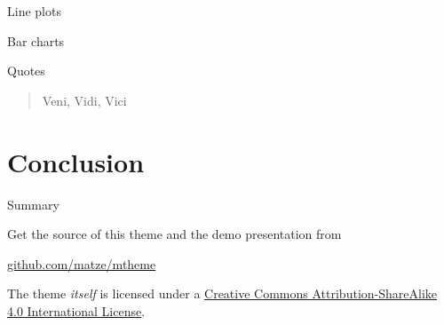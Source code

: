 \documentclass[10pt, compress]{beamer}
\renewcommand{\(}{\begin{columns}}
\renewcommand{\)}{\end{columns}}
\newcommand{\<}[1]{\begin{column}{#1}}
\renewcommand{\>}{\end{column}}
\begin{document}
\begin{frame}{Line plots}
  \begin{figure}
  \end{figure}
\end{frame}
\begin{frame}{Bar charts}
  \begin{figure}
  \end{figure}
\end{frame}
\begin{frame}{Quotes}
  \begin{quote}
    Veni, Vidi, Vici
  \end{quote}
\end{frame}


\section{Conclusion}

\begin{frame}{Summary}

  Get the source of this theme and the demo presentation from

  \begin{center}\url{github.com/matze/mtheme}\end{center}

  The theme \emph{itself} is licensed under a
  \href{http://creativecommons.org/licenses/by-sa/4.0/}{Creative Commons
  Attribution-ShareAlike 4.0 International License}.

  \begin{center}\ccbysa\end{center}

\end{frame}

\end{document}
